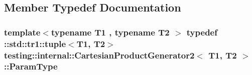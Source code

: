 \subsection{Member Typedef Documentation}
\hypertarget{classtesting_1_1internal_1_1CartesianProductGenerator2_a036b6f14a61a69fac5d21dd7ff5b8913}{
\subsubsection[{Param\-Type}]{\setlength{\rightskip}{0pt plus 5cm}template$<$typename T1 , typename T2 $>$ typedef \-::{\bf std\-::tr1\-::tuple}$<$T1, T2$>$ {\bf testing\-::internal\-::\-Cartesian\-Product\-Generator2}$<$ T1, T2 $>$\-::{\bf Param\-Type}}}\label{classtesting_1_1internal_1_1CartesianProductGenerator2_a036b6f14a61a69fac5d21dd7ff5b8913}


